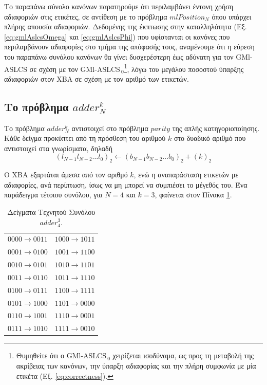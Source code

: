 Το παραπάνω σύνολο κανόνων παρατηρούμε ότι περιλαμβάνει έντονη χρήση αδιαφοριών στις ετικέτες, σε αντίθεση με το πρόβλημα $mlPosition_{N}$ όπου υπάρχει πλήρης απουσία αδιαφοριών. Δεδομένης της έκπτωσης στην καταλληλότητα (Εξ. \ref{eq:gmlAslcsOmega} και \ref{eq:gmlAslcsPhi}) που υφίστανται οι κανόνες που περιλαμβάνουν αδιαφορίες στο τμήμα της απόφασής τους, αναμένουμε ότι η εύρεση του παραπάνω συνόλου κανόνων θα γίνει δυσχερέστερη έως αδύνατη για τον GMl-ASLCS σε σχέση με τον GMl-ASLCS$_{\:0}$\footnote{Θυμηθείτε ότι ο GMl-ASLCS$_{\:0}$ χειρίζεται ισοδύναμα, ως προς τη μεταβολή της ακρίβειας των κανόνων, την ύπαρξη αδιαφορίας και την πλήρη συμφωνία με μία ετικέτα (Εξ. \ref{eq:correctness}).}, λόγω του μεγάλου ποσοστού ύπαρξης αδιαφοριών στον ΧΒΑ σε σχέση με τον αριθμό των ετικετών.



\subsection{Το πρόβλημα $adder^{k}_{N}$}
Το πρόβλημα $adder^{k}_{N}$ αντιστοιχεί στο πρόβλημα $parity$ της απλής κατηγοριοποίησης. Κάθε δείγμα προκύπτει από τη πρόσθεση του αριθμού $k$ στο δυαδικό αριθμό που αντιστοιχεί στα γνωρίσματα, δηλαδή $$\left(l_{N-1}l_{N-2} \dots l_0 \right)_2 \leftarrow \left(b_{N-1}b_{N-2} \dots b_0 \right)_2+ (k)_{2}$$ 

Ο ΧΒΑ εξαρτάται άμεσα από τον αριθμό $k$, ενώ η αναπαράσταση ετικετών με αδιαφορίες, ανά περίπτωση, ίσως να μη μπορεί να συμπιέσει το μέγεθός του. Ένα παράδειγμα τέτοιου συνόλου, για $N=4$ και $k=3$, φαίνεται στον Πίνακα \ref{table:adder4Elements}.

\begin{table}[!h]
\caption{Δείγματα Τεχνητού Συνόλου $adder_{4}^{3}$.}
\label{table:adder4Elements}
\begin{center}
\begin{tabular}{l|l}
$0000 \rightarrow 0011$ & $1000 \rightarrow 1011$\\
$0001 \rightarrow 0100$ & $1001 \rightarrow 1100$\\
$0010 \rightarrow 0101$ & $1010 \rightarrow 1101$\\
$0011 \rightarrow 0110$ & $1011 \rightarrow 1110$\\
$0100 \rightarrow 0111$ & $1100 \rightarrow 1111$\\
$0101 \rightarrow 1000$ & $1101 \rightarrow 0000$\\
$0110 \rightarrow 1001$ & $1110 \rightarrow 0001$\\
$0111 \rightarrow 1010$ & $1111 \rightarrow 0010$
\end{tabular}
\end{center}
\end{table}



